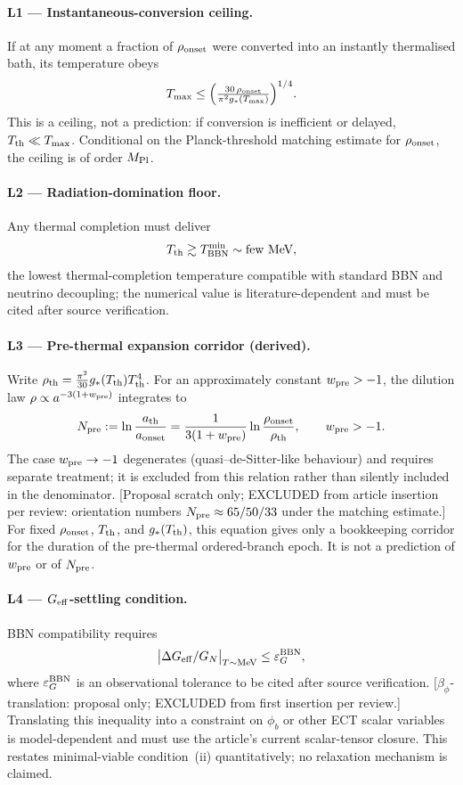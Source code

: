 \paragraph{L1 --- Instantaneous-conversion ceiling.}
If at any moment a fraction of $\rho_{\rm onset}$ were converted
into an instantly thermalised bath, its temperature obeys
\[
T_{\max}\le
\Bigl(\tfrac{30\,\rho_{\rm onset}}{\pi^2 g_*(T_{\max})}\Bigr)^{1/4}.
\]
This is a ceiling, not a prediction: if conversion is inefficient
or delayed, $T_{\rm th}\ll T_{\max}$.
Conditional on the Planck-threshold matching estimate for
$\rho_{\rm onset}$, the ceiling is of order $M_{\rm Pl}$.

\paragraph{L2 --- Radiation-domination floor.}
Any thermal completion must deliver
\[
T_{\rm th}\gtrsim T^{\min}_{\rm BBN}\sim\text{few~MeV},
\]
the lowest thermal-completion temperature compatible with standard
BBN and neutrino decoupling; the numerical value is
literature-dependent and must be cited after source verification.

\paragraph{L3 --- Pre-thermal expansion corridor (derived).}
Write $\rho_{\rm th}=\tfrac{\pi^2}{30}g_*(T_{\rm th})T_{\rm th}^4$.
For an approximately constant $w_{\rm pre}>-1$, the dilution law
$\rho\propto a^{-3(1+w_{\rm pre})}$ integrates to
\[
N_{\rm pre}
:=\ln\frac{a_{\rm th}}{a_{\rm onset}}
=\frac{1}{3(1+w_{\rm pre})}
 \ln\frac{\rho_{\rm onset}}{\rho_{\rm th}},
\qquad w_{\rm pre}>-1 .
\]
The case $w_{\rm pre}\to-1$ degenerates (quasi--de-Sitter-like
behaviour) and requires separate treatment; it is excluded from
this relation rather than silently included in the denominator.
[Proposal scratch only; EXCLUDED from article insertion per
review: orientation numbers $N_{\rm pre}\approx65/50/33$ under the
matching estimate.]
For fixed $\rho_{\rm onset}$, $T_{\rm th}$, and
$g_*(T_{\rm th})$, this equation gives only a bookkeeping corridor
for the duration of the pre-thermal ordered-branch epoch.
It is not a prediction of $w_{\rm pre}$ or of $N_{\rm pre}$.

\paragraph{L4 --- $G_{\rm eff}$-settling condition.}
BBN compatibility requires
\[
\bigl|\Delta G_{\rm eff}/G_N\bigr|_{T\sim{\rm MeV}}
\le\varepsilon_G^{\rm BBN},
\]
where $\varepsilon_G^{\rm BBN}$ is an observational tolerance to
be cited after source verification.
[$\beta_\phi$-translation: proposal only; EXCLUDED from first
insertion per review.]
Translating this inequality into a constraint on $\phi_b$ or other
ECT scalar variables is model-dependent and must use the article's
current scalar-tensor closure.
This restates minimal-viable condition~(ii) quantitatively; no
relaxation mechanism is claimed.

